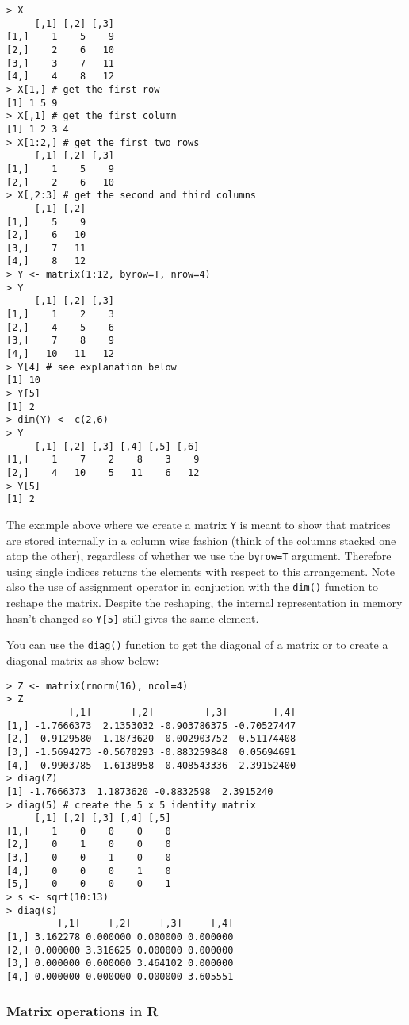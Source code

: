 \begin{lstlisting}
> X
     [,1] [,2] [,3]
[1,]    1    5    9
[2,]    2    6   10
[3,]    3    7   11
[4,]    4    8   12
> X[1,] # get the first row
[1] 1 5 9
> X[,1] # get the first column
[1] 1 2 3 4
> X[1:2,] # get the first two rows
     [,1] [,2] [,3]
[1,]    1    5    9
[2,]    2    6   10
> X[,2:3] # get the second and third columns
     [,1] [,2]
[1,]    5    9
[2,]    6   10
[3,]    7   11
[4,]    8   12
> Y <- matrix(1:12, byrow=T, nrow=4)
> Y
     [,1] [,2] [,3]
[1,]    1    2    3
[2,]    4    5    6
[3,]    7    8    9
[4,]   10   11   12
> Y[4] # see explanation below
[1] 10 
> Y[5]
[1] 2
> dim(Y) <- c(2,6)
> Y
     [,1] [,2] [,3] [,4] [,5] [,6]
[1,]    1    7    2    8    3    9
[2,]    4   10    5   11    6   12
> Y[5]
[1] 2
\end{lstlisting}
The example above where we create a matrix \lstinline!Y! is meant to
show that matrices are stored internally in a column wise fashion (think
of the columns stacked one atop the other), regardless of whether we use
the \lstinline!byrow=T! argument. Therefore using single indices returns
the elements with respect to this arrangement. Note also the use of
assignment operator in conjuction with the \lstinline!dim()! function to
reshape the matrix. Despite the reshaping, the internal representation
in memory hasn't changed so \lstinline!Y[5]! still gives the same
element.

You can use the \lstinline!diag()! function to get the diagonal of a
matrix or to create a diagonal matrix as show below:

\begin{lstlisting}
> Z <- matrix(rnorm(16), ncol=4)
> Z
           [,1]       [,2]         [,3]        [,4]
[1,] -1.7666373  2.1353032 -0.903786375 -0.70527447
[2,] -0.9129580  1.1873620  0.002903752  0.51174408
[3,] -1.5694273 -0.5670293 -0.883259848  0.05694691
[4,]  0.9903785 -1.6138958  0.408543336  2.39152400
> diag(Z)
[1] -1.7666373  1.1873620 -0.8832598  2.3915240
> diag(5) # create the 5 x 5 identity matrix
     [,1] [,2] [,3] [,4] [,5]
[1,]    1    0    0    0    0
[2,]    0    1    0    0    0
[3,]    0    0    1    0    0
[4,]    0    0    0    1    0
[5,]    0    0    0    0    1
> s <- sqrt(10:13)
> diag(s)
         [,1]     [,2]     [,3]     [,4]
[1,] 3.162278 0.000000 0.000000 0.000000
[2,] 0.000000 3.316625 0.000000 0.000000
[3,] 0.000000 0.000000 3.464102 0.000000
[4,] 0.000000 0.000000 0.000000 3.605551
\end{lstlisting}
\subsubsection{Matrix operations in R}

